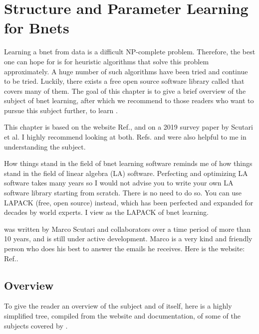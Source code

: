 \chapter{Structure and Parameter
 Learning for Bnets}\label{ch-struc-learn}


Learning a bnet
from data
is a difficult NP-complete
problem. 
Therefore,
the best one can hope
for is for heuristic algorithms 
that solve this problem
approximately. A huge number 
of such algorithms have been tried
and continue to be tried.
Luckily,
there exists a free open source
 software library
called \bnlearn
that covers many of
them. The goal
of this chapter
is to give
a brief
overview
of the subject
of bnet 
learning,
after 
which
we recommend
to
those readers who
want to
pursue this subject
further,
to 
learn \bnlearn.

This chapter
is based on  
the \bnlearn website Ref.\cite{bnlearn}, and
on a 2019 survey
paper 
\cite{scutari2019}
by Scutari et al.
I highly recommend looking
at both. Refs.
\cite{carvalho} and \cite{margaritis}
were also
helpful to me in understanding the subject.


How things stand
in the field of
bnet learning software reminds me
of how things stand in 
the field of linear 
algebra (LA) software. Perfecting and
optimizing
LA software
takes many years so
I would not
advise you to write your own
LA software library starting
from scratch.
There is no need to do so. You
can use LAPACK (free, open source)
instead, which
has been perfected and expanded
for decades by world experts. 
I view \bnlearn as the LAPACK
of bnet learning. 

\bnlearn was
written by Marco Scutari
and collaborators
over a time period of
more than 10 years,
and is still
under active development.
Marco is a very kind and friendly
person who does his best to
answer the emails he receives.
Here is the \bnlearn website: Ref.\cite{bnlearn}.



\section*{Overview}

To give
the reader an overview
of the subject
and of \bnlearn itself,
here is a highly
simplified tree,
compiled from
the \bnlearn website
and documentation,
of some of the
subjects covered by \bnlearn.



